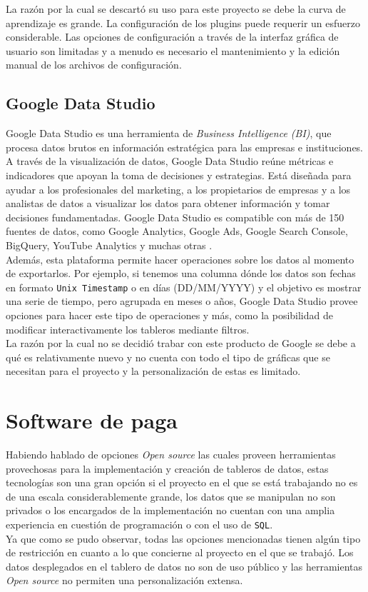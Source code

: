 La razón por la cual se descartó su uso para este proyecto se debe la curva de aprendizaje es grande. La configuración de los plugins puede requerir un esfuerzo considerable. Las opciones de configuración a través de la interfaz gráfica de usuario son limitadas y a menudo es necesario el mantenimiento y la edición manual de los archivos de configuración.


\subsection{Google Data Studio}
Google Data Studio es una herramienta de \textit{Business Intelligence (BI)}, que procesa datos brutos en información estratégica para las empresas e instituciones. A través de la visualización de datos, Google Data Studio reúne métricas e indicadores que apoyan la toma de decisiones y estrategias. Está diseñada para ayudar a los profesionales del marketing, a los propietarios de empresas y a los analistas de datos a visualizar los datos para obtener información y tomar decisiones fundamentadas. Google Data Studio es compatible con más de 150 fuentes de datos, como Google Analytics, Google Ads, Google Search Console, BigQuery, YouTube Analytics y muchas otras \cite{kemp2021google}.\\
Además, esta plataforma permite hacer operaciones sobre los datos al momento de exportarlos. Por ejemplo, si tenemos una columna dónde los datos son fechas en formato \texttt{Unix Timestamp} o en días (DD/MM/YYYY) y el objetivo es mostrar una serie de tiempo, pero agrupada en meses o años, Google Data Studio provee opciones para hacer este tipo de operaciones y más, como la posibilidad de modificar interactivamente los tableros mediante filtros.\\

La razón por la cual no se decidió trabar con este producto de Google se debe a qué es relativamente nuevo y no cuenta con todo el tipo de gráficas que se necesitan para el proyecto y la personalización de estas es limitado.


\section{Software de paga}
Habiendo hablado de opciones \textit{Open source} las cuales proveen herramientas provechosas para la implementación y creación de tableros de datos, estas tecnologías son una gran opción si el proyecto en el que se está trabajando no es de una escala considerablemente grande, los datos que se manipulan no son privados o los encargados de la implementación no cuentan con una amplia experiencia en cuestión de programación o con el uso de \texttt{SQL}.\\
Ya que como se pudo observar, todas las opciones mencionadas tienen algún tipo de restricción en cuanto a lo que concierne al proyecto en el que se trabajó. Los datos desplegados en el tablero de datos no son de uso público y las herramientas \textit{Open source} no permiten una personalización extensa.\\

